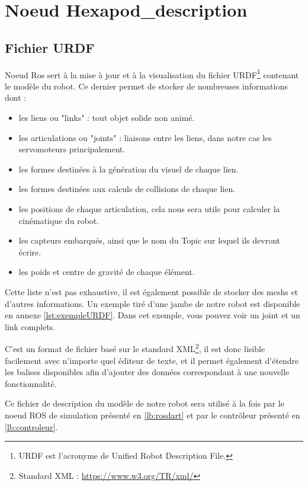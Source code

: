 \documentclass{tnreport}
\begin{document}
\section{Noeud Hexapod\_description}

\subsection{Fichier URDF}
Noeud Ros sert à la mise à jour et à la visualisation du fichier URDF\footnote{URDF est l'acronyme de Unified Robot Description File.} contenant le modèle du robot. Ce dernier permet de stocker de nombreuses informations dont :
\begin{itemize}
    \item les liens ou "links" : tout objet solide non animé.
    \item les articulations ou "joints" : liaisons entre les liens, dans notre cas les \gls{servomoteur}s principalement.
    \item les formes destinées à la génération du visuel de chaque lien.
    \item les formes destinées aux calculs de collisions de chaque lien.
    \item les positions de chaque articulation, cela nous sera utile pour calculer la cinématique du robot.
    \item les capteurs embarqués, ainsi que le nom du Topic sur lequel ils devront écrire.
    \item les poids et centre de gravité de chaque élément.
\end{itemize}

Cette liste n'est pas exhaustive, il est également possible de stocker des meshs et d'autres informations. Un exemple tiré d'une jambe de notre robot est disponible en annexe \ref{lst:exempleURDF}. Dans cet exemple, vous pouvez voir un joint et un link complets. 

C'est un format de fichier basé sur le standard XML\footnote{Standard XML : \url{https://www.w3.org/TR/xml/}}, il est donc lisible facilement avec n'importe quel éditeur de texte, et il permet également d'étendre les balises disponibles afin d'ajouter des données correspondant à une nouvelle fonctionnalité. 



Ce fichier de description du modèle de notre robot sera utilisé à la fois par le noeud ROS de simulation présenté en \ref{lb:rosdart} et par le contrôleur présenté en \ref{lb:controleur}.
\end{document}
